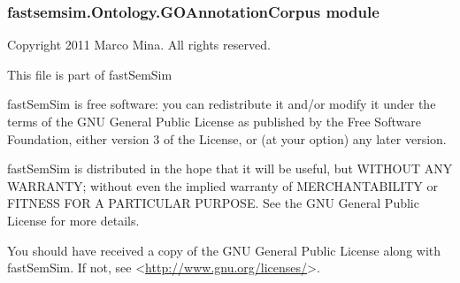\documentclass[letterpaper,10pt,english]{sphinxmanual}
\begin{document}
\subsubsection{fastsemsim.Ontology.GOAnnotationCorpus module}
\label{fastsemsim.Ontology:module-fastsemsim.Ontology.GOAnnotationCorpus}\label{fastsemsim.Ontology:fastsemsim-ontology-goannotationcorpus-module}
Copyright 2011 Marco Mina. All rights reserved.

This file is part of fastSemSim

fastSemSim is free software: you can redistribute it and/or modify
it under the terms of the GNU General Public License as published by
the Free Software Foundation, either version 3 of the License, or
(at your option) any later version.

fastSemSim is distributed in the hope that it will be useful,
but WITHOUT ANY WARRANTY; without even the implied warranty of
MERCHANTABILITY or FITNESS FOR A PARTICULAR PURPOSE.  See the
GNU General Public License for more details.

You should have received a copy of the GNU General Public License
along with fastSemSim.  If not, see \textless{}\href{http://www.gnu.org/licenses/}{http://www.gnu.org/licenses/}\textgreater{}.
\end{document}
